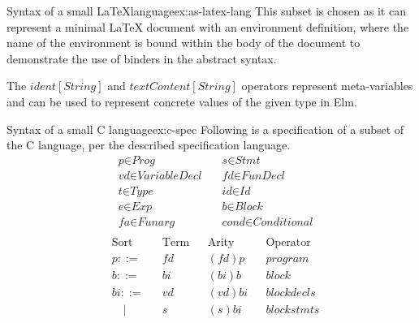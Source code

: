 \begin{example}{Syntax of a small \LaTeX language}{ex:as-latex-lang}
  This subset is chosen as it can represent a minimal LaTeX document with an environment
  definition, where the name of the environment is bound within the body
  of the document to demonstrate the use of binders in the abstract syntax.

  The $ident[String]$ and $textContent[String]$ operators represent meta-variables and can be used to represent concrete values of the given type in Elm.
\end{example}
\newpage

\begin{example}[breakable]{Syntax of a small C language}{ex:c-spec}
  Following is a specification of a subset of the C language\cite{c-iso-standard}, per the described specification language.
  \[
    \begin{aligned}
       & \textit{p}         \in \textit{Prog}           \quad & \textit{s}           \in \textit{Stmt}      \\
       & \textit{vd}        \in \textit{VariableDecl}   \quad & \textit{fd}        \in \textit{FunDecl}     \\
       & \textit{t}         \in \textit{Type}           \quad & \textit{id}          \in \textit{Id}        \\
       & \textit{e}         \in \textit{Exp}            \quad & \textit{b}           \in \textit{Block}     \\
       & \textit{fa}        \in \textit{Funarg}         \quad & \textit{cond}      \in \textit{Conditional} \\
    \end{aligned}
  \]
  \[
    \begin{aligned}
       & \text{Sort}     &  & \text{Term}                                            &  & \text{Arity}                  &  & \text{Operator}      \\
       & p ::=           &  & \textit{fd}                                            &  & (fd)p                         &  & program              \\
       & b ::=           &  & \text{$bi$}                                            &  & (bi)b                         &  & block                \\
       & bi ::=          &  & \text{$vd$}                                            &  & (vd)bi                        &  & blockdecls           \\
       & \quad |         &  & \text{$s$}                                             &  & (s)bi                         &  & blockstmts           \\

\end{aligned}\]
\end{example}
